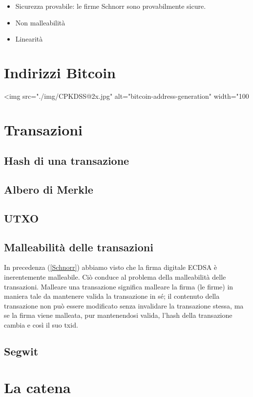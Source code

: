 \documentclass{book}
\theoremstyle{definition}
\begin{document}
\begin{itemize}
    \item Sicurezza provabile: le firme Schnorr sono provabilmente sicure.
    \item Non malleabilità
    \item Linearità
\end{itemize}

\newpage
\section{Indirizzi Bitcoin}

<img src="./img/CPKDSS@2x.jpg" alt="bitcoin-address-generation" width="100%

\newpage
\section{Transazioni}
\subsection{Hash di una transazione}
\subsection{Albero di Merkle}
\subsection{UTXO}
\subsection{Malleabilità delle transazioni}
In precedenza (\ref{Schnorr}) abbiamo visto che la firma digitale ECDSA è inerentemente malleabile.
Ciò conduce al problema della malleabilità delle transazioni.
Malleare una transazione significa malleare la firma (le firme) in maniera tale da mantenere valida la transazione in sé;
il contenuto della transazione non può essere modificato senza invalidare la transazione stessa, ma se la firma viene malleata, 
pur mantenendosi valida, l'hash della transazione cambia e così il suo txid.
\subsection{Segwit}

\newpage
\section{La catena}
\end{document}
